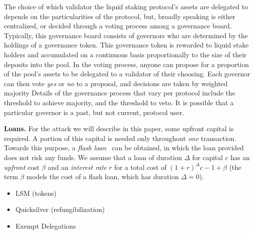 
The choice of which validator the liquid staking protocol's assets are delegated to
depends on the particularities of the protocol, but, broadly speaking
is either centralized, or decided through a voting process among a governance board.
Typically, this governance board consists of governors who are determined by the holdings
of a governance token. This governance token is rewarded to liquid stake holders and accumulated
on a continuous basis proportionally to the size of their deposits into the pool.
In the voting process, anyone can propose for a proportion of the pool's assets
to be delegated to a validator of their choosing.
Each governor can then vote \emph{yes} or \emph{no}
to a proposal, and decisions are taken by weighted majority
Details of the governance process
that vary per protocol include the threshold to achieve majority, and the threshold to
veto. It is possible that a particular governor is a past, but not current, protocol user.

\noindent
\textbf{Loans.} For the attack we will describe in this paper, some upfront
capital is required. A portion of this capital is needed only throughout \emph{one}
transaction. Towards this purpose, a \emph{flash loan}~\cite{gudgeon2020defi} can
be obtained, in which the loan provided does not risk any funds. We assume that
a loan of duration $\Delta$ for capital $c$ has an \emph{upfront} cost $\beta$
and an \emph{interest rate} $r$ for a total cost of
$(1 + r)^\Delta c - 1 + \beta$ (the term $\beta$ models the cost of a flash loan,
which has duration $\Delta = 0$).

\begin{itemize}
  \item LSM (tokens)
  \item Quicksilver (refungibilization)
  \item Exempt Delegations
\end{itemize}

